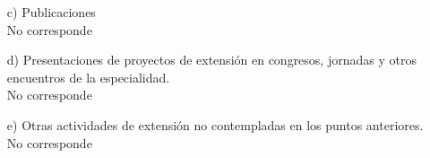 \begin{enumerate}[leftmargin=0.8cm]
{\begin{itemize}[leftmargin=0.2cm]
{\begin{itemize}[leftmargin=0.2cm]
        \end{itemize}

      }

      \item[ii)]{de articulación con otros niveles educativos.

        \begin{itemize}[leftmargin=0.2cm]

          {}{14 de Diciembre de 2018, de 8:30hs a 18hs.}
          {\emph{Docente}. Participé tanto en el dictado como en el armado de la clase.}

          {}{10 de Agosto de 2018, de 10hs a 12hs.}
          {\emph{Docente}. Participé en el armado de la clase.}

        \end{itemize}

      }

    \end{itemize}
  }

  \item[c)]{Publicaciones
    \\ No corresponde
  }

  \item[d)]{Presentaciones de proyectos de extensión en congresos, jornadas y otros encuentros de la especialidad.
    \\ No corresponde
  }

  \item[e)]{Otras actividades de extensión no contempladas en los puntos anteriores.
    \\ No corresponde
  }

\end{enumerate}
